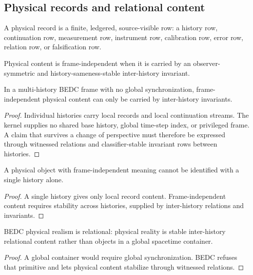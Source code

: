 \subsection{Physical records and relational content}
\label{subsec:philosophy-physical-records-relational-content}

\begin{definition}
\label{def:philosophy-physical-record}
A physical record is a finite, ledgered, source-visible row: a history
row, continuation row, measurement row, instrument row, calibration
row, error row, relation row, or falsification row.
\end{definition}

\begin{definition}
\label{def:philosophy-frame-independent-physical-content}
Physical content is frame-independent when it is carried by an
observer-symmetric and history-sameness-stable inter-history invariant.
\end{definition}

\begin{theorem}
\label{thm:philosophy-physical-content-inter-history-invariant}
In a multi-history BEDC frame with no global synchronization,
frame-independent physical content can only be carried by inter-history
invariants.
\end{theorem}
\begin{proof}
Individual histories carry local records and local continuation
streams. The kernel supplies no shared base history, global time-step
index, or privileged frame. A claim that survives a change of
perspective must therefore be expressed through witnessed relations and
classifier-stable invariant rows between histories.
\end{proof}

\begin{corollary}
\label{cor:philosophy-physical-objects-not-single-history}
A physical object with frame-independent meaning cannot be identified
with a single history alone.
\end{corollary}
\begin{proof}
A single history gives only local record content. Frame-independent
content requires stability across histories, supplied by inter-history
relations and invariants.
\end{proof}

\begin{corollary}
\label{cor:philosophy-relational-physical-realism}
BEDC physical realism is relational: physical reality is stable
inter-history relational content rather than objects in a global
spacetime container.
\end{corollary}
\begin{proof}
A global container would require global synchronization. BEDC refuses
that primitive and lets physical content stabilize through witnessed
relations.
\end{proof}


